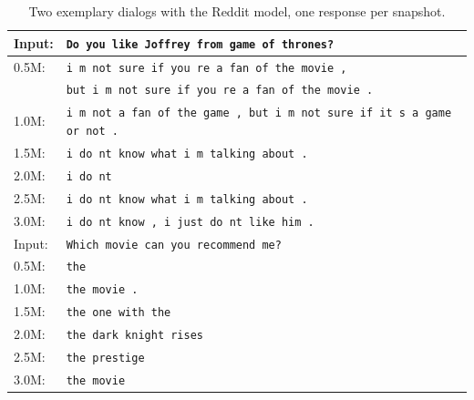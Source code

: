 \begin{table}[H]
	\centering
	\begin{adjustbox}{max width=\textwidth}
		\begin{tabularx}{\textwidth}{lX}
			\toprule
			Input: 	& \texttt{Do you like Joffrey from game of thrones?}\\
			\midrule
			0.5M: 	& \texttt{i m not sure if you re a fan of the movie ,}\\
			& \texttt{but i m not sure if you re a fan of the movie .}\\
			1.0M: 	& \texttt{i m not a fan of the game , but i m not sure if it s a game or not .}\\
			1.5M:	& \texttt{i do nt know what i m talking about .}\\
			2.0M:	& \texttt{i do nt }\\
			2.5M:	& \texttt{i do nt know what i m talking about .}\\
			3.0M:	& \texttt{i do nt know , i just do nt like him .}\\
			\midrule
			Input: 	& \texttt{Which movie can you recommend me?}\\
			\midrule
			0.5M: 	& \texttt{the}\\
			1.0M: 	& \texttt{the movie .}\\
			1.5M:	& \texttt{the one with the}\\
			2.0M:	& \texttt{the dark knight rises}\\
			2.5M:	& \texttt{the prestige}\\
			3.0M:	& \texttt{the movie}\\
			\bottomrule
		\end{tabularx}
	\end{adjustbox}
	\caption{Two exemplary dialogs with the Reddit model, one response per snapshot.}
	\label{results:example_output:reddit}
\end{table}

